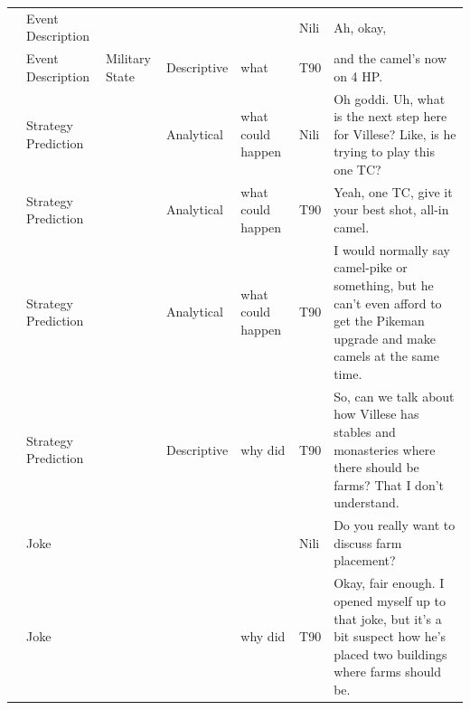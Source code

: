 {\begin{longtable}{@{}>{\theAppRow}r|L{2.3cm}L{2.2cm}L{1.4cm}L{2.2cm}L{0.5cm}U{5.6cm}@{}}
    & Event Description     &                      &             &                   & Nili    & Ah, okay,                                                                                                                                                                                                                \\
    & Event Description     & Military State       & Descriptive   & what              & T90     & and the camel's now on 4 HP.                                                                                                                                                                                             \\
    & Strategy Prediction   &                      & Analytical  & what could happen & Nili    & Oh goddi. Uh, what is the next step here for Villese? Like, is he trying to play this one TC?                                                                                                                            \\
    & Strategy Prediction   &                      & Analytical  & what could happen & T90     & Yeah, one TC, give it your best shot, all-in camel.                                                                                                                                                                      \\
    & Strategy Prediction   &                      & Analytical  & what could happen & T90     & I would normally say camel-pike or something, but he can't even afford to get the Pikeman upgrade and make camels at the same time.                                                                                      \\
    & Strategy Prediction   &                      & Descriptive   & why did           & T90     & So, can we talk about how Villese has stables and monasteries where there should be farms? That I don't understand.                                                                                                      \\
    & Joke                  &                      &             &                   & Nili    & Do you really want to discuss farm placement?                                                                                                                                                                            \\
    & Joke                  &                      &             & why did           & T90     & Okay, fair enough. I opened myself up to that joke, but it's a bit suspect how he's placed two buildings where farms should be.                                                                                          \\

\end{longtable}}
